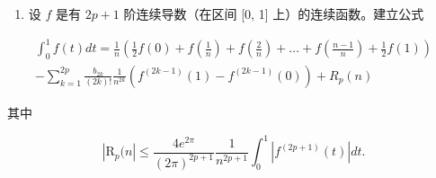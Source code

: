 \begin{enumerate}
\def\labelenumi{\arabic{enumi})}
\setcounter{enumi}{2}
\tightlist
\item
  设 \(f\) 是有 \(2p + 1\) 阶连续导数（在区间 {[}0, 1{]} 上）的连续函数。建立公式
\end{enumerate}

\[
\begin{array}{l} \int_ {0} ^ {1} f (t) d t = \frac {1}{n} \left(\frac {1}{2} f (0) + f \left(\frac {1}{n}\right) + f \left(\frac {2}{n}\right) + \dots + f \left(\frac {n - 1}{n}\right) + \frac {1}{2} f (1)\right) \\ - \sum_ {k = 1} ^ {2 p} \frac {b _ {2 k}}{(2 k) !} \frac {1}{n ^ {2 k}} (f ^ {(2 k - 1)} (1) - f ^ {(2 k - 1)} (0)) + R _ {p} (n) \end{array}
\]

其中

\[
\left| \mathrm{R} _ {p} (n \right| \leqslant \frac {4 e ^ {2 \pi}}{(2 \pi) ^ {2 p + 1}} \frac {1}{n ^ {2 p + 1}} \int_ {0} ^ {1} \left| f ^ {(2 p + 1)} (t) \right| d t.
\]

